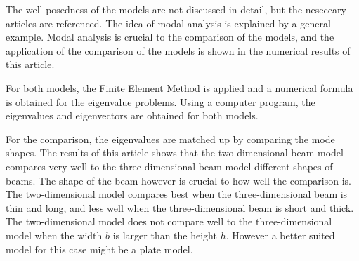 The well posedness of the models are not discussed in detail, but the neseccary articles are referenced. The idea of modal analysis is explained by a general example. Modal analysis is crucial to the comparison of the models, and the application of the comparison of the models is shown in the numerical results of this article.

For both models, the Finite Element Method is applied and a numerical formula is obtained for the eigenvalue problems. Using a computer program, the eigenvalues and eigenvectors are obtained for both models. 

For the comparison, the eigenvalues are matched up by comparing the mode shapes. The results of this article shows that the two-dimensional beam model compares very well to the three-dimensional beam model different shapes of beams. The shape of the beam however is crucial to how well the comparison is. The two-dimensional model compares best when the three-dimensional beam is thin and long, and less well when the three-dimensional beam is short and thick. The two-dimensional model does not compare well to the three-dimensional model when the width $b$ is larger than the height $h$. However a better suited model for this case might be a plate model.





